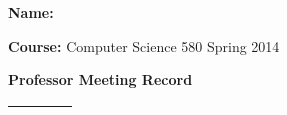 \documentclass[letterpaper, 10pt]{article} %
\begin{document}
\pagestyle{empty}

\vspace*{-.5in}

{\bf Name:}

\vspace*{.25in}

{\bf Course:} Computer Science 580 Spring 2014

\vspace*{.1in}

\begin{center}

{\large 

{\bf Professor Meeting Record}

}

\vspace*{.2in}

\begin{tabular}{| l | l | c | c | }
  \hline
  \begin{minipage}{1in}\begin{center}\vspace*{.05in}{\bf Date}\vspace*{.05in}\end{center}\end{minipage} & 
  \begin{minipage}{1.5in}\begin{center}\vspace*{.05in}{\bf Meeting Topic}\vspace*{.05in}\end{center}\end{minipage} & 
  \begin{minipage}{1.5in}\begin{center}\vspace*{.05in}{\bf Meeting Duration}\vspace*{.05in}\end{center}\end{minipage} &  
  \begin{minipage}{1.5in}\begin{center}\vspace*{.05in}{\bf Professor's Initials}\vspace*{.05in}\end{center}\end{minipage}  \\
  \hline 


\end{tabular}
\end{center}
\end{document}
